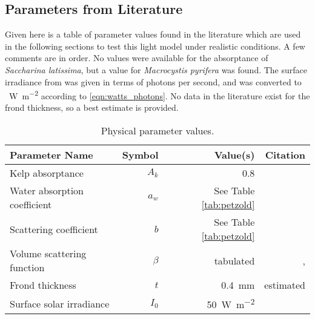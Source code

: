 \subsection{Parameters from Literature}
Given here is a table of parameter values found in the literature which are used in the following sections to test this light model under realistic conditions.
A few comments are in order.
No values were available for the absorptance of \textit{Saccharina latissima}, but a value for \textit{Macrocystis pyrifera} was found.
The surface irradiance from \cite{broch_modelling_2012} was given in terms of photons per second,
and was converted to \SI{}{\W\per\m\squared} according to \eqref{eqn:watts_photons}.
No data in the literature exist for the frond thickness, so a best estimate is provided.

\begin{table}[h]
  \centering
  \caption{Physical parameter values.}
  \begin{tabular}{lrrr}
    \toprule
    Parameter Name & Symbol & Value(s) & Citation \\ %
    \midrule
    Kelp absorptance & $A_k$ & 0.8 & \cite{colombo-pallotta_photosynthetic_2006} \\%
    Water absorption coefficient & $a_w$ & See Table \ref{tab:petzold} & \cite{petzold_volume_1972} \\%
    Scattering coefficient & $b$  & See Table \ref{tab:petzold} & \cite{petzold_volume_1972} \\%
    Volume scattering function & $\beta$ & tabulated & \cite{petzold_volume_1972,sokolov_parameterization_2010}, \\%
    Frond thickness & $t$ & \SI{0.4}{\mm} & estimated \\
    Surface solar irradiance & $I_0$ & \SI{50}{\W\per\m\squared} & \cite{broch_modelling_2012}  \\%
    \bottomrule
  \end{tabular}
  \label{tab:params}
\end{table}

